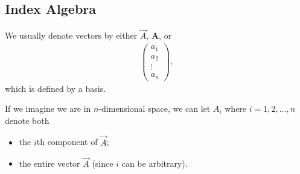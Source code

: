 \documentclass[10pt]{mypackage}
\begin{document}
\subsection{Index Algebra}%
We usually denote vectors by either $\vec{A}$, $\mathbf{A}$, or
\begin{align*}
  \begin{pmatrix}a_1\\a_2\\\vdots\\a_n\end{pmatrix},
\end{align*}
which is defined by a basis.\newline

If we imagine we are in $n$-dimensional space, we can let $A_i$ where $i = 1,2,\dots,n$ denote both
\begin{itemize}
  \item the $i$th component of $\vec A$;
  \item the entire vector $\vec{A}$ (since $i$ can be arbitrary).
\end{itemize}
\end{document}
